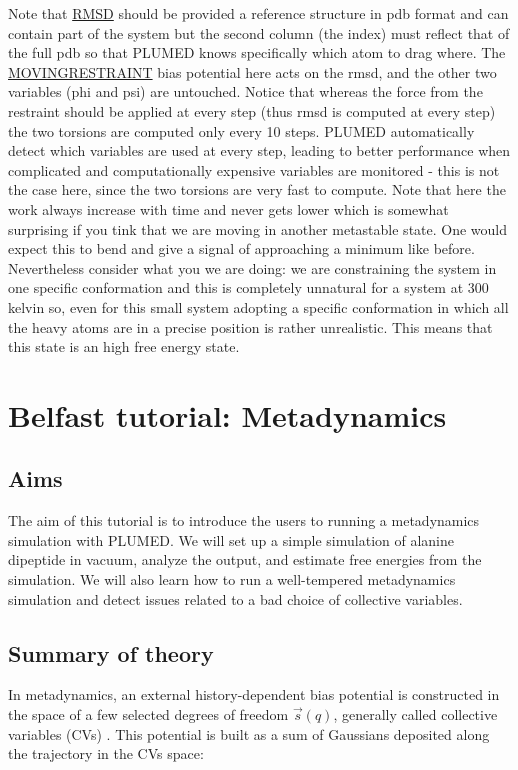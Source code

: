 Note that \hyperlink{RMSD}{R\+M\+S\+D} should be provided a reference structure in pdb format and can contain part of the system but the second column (the index) must reflect that of the full pdb so that P\+L\+U\+M\+E\+D knows specifically which atom to drag where. The \hyperlink{MOVINGRESTRAINT}{M\+O\+V\+I\+N\+G\+R\+E\+S\+T\+R\+A\+I\+N\+T} bias potential here acts on the rmsd, and the other two variables (phi and psi) are untouched. Notice that whereas the force from the restraint should be applied at every step (thus rmsd is computed at every step) the two torsions are computed only every 10 steps. P\+L\+U\+M\+E\+D automatically detect which variables are used at every step, leading to better performance when complicated and computationally expensive variables are monitored -\/ this is not the case here, since the two torsions are very fast to compute. Note that here the work always increase with time and never gets lower which is somewhat surprising if you tink that we are moving in another metastable state. One would expect this to bend and give a signal of approaching a minimum like before. Nevertheless consider what you we are doing\+: we are constraining the system in one specific conformation and this is completely unnatural for a system at 300 kelvin so, even for this small system adopting a specific conformation in which all the heavy atoms are in a precise position is rather unrealistic. This means that this state is an high free energy state. \hypertarget{belfast-6}{}\section{Belfast tutorial\+: Metadynamics}\label{belfast-6}
\hypertarget{belfast-10_Aims}{}\subsection{Aims}\label{belfast-10_Aims}
The aim of this tutorial is to introduce the users to running a metadynamics simulation with P\+L\+U\+M\+E\+D. We will set up a simple simulation of alanine dipeptide in vacuum, analyze the output, and estimate free energies from the simulation. We will also learn how to run a well-\/tempered metadynamics simulation and detect issues related to a bad choice of collective variables.\hypertarget{belfast-6_belfast-6-theory}{}\subsection{Summary of theory}\label{belfast-6_belfast-6-theory}
In metadynamics, an external history-\/dependent bias potential is constructed in the space of a few selected degrees of freedom $ \vec{s}({q}) $, generally called collective variables (C\+Vs) \cite{metad}. This potential is built as a sum of Gaussians deposited along the trajectory in the C\+Vs space\+:

